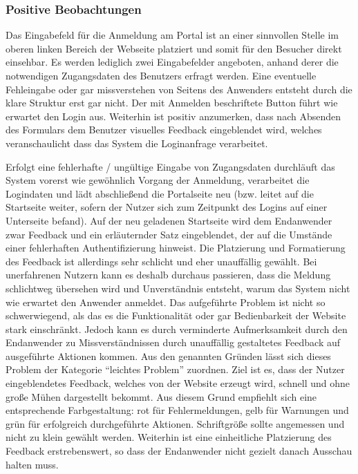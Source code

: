 
\subsubsection*{Positive Beobachtungen}
Das Eingabefeld für die Anmeldung am Portal ist an einer sinnvollen Stelle im oberen linken Bereich der Webseite platziert und somit für den Besucher direkt einsehbar. Es werden lediglich zwei Eingabefelder angeboten, anhand derer die notwendigen Zugangsdaten des Benutzers erfragt werden. Eine eventuelle Fehleingabe oder gar missverstehen von Seitens des Anwenders entsteht durch die klare Struktur erst gar nicht. Der mit Anmelden beschriftete Button führt wie erwartet den Login aus. Weiterhin ist positiv anzumerken, dass nach Absenden des Formulars dem Benutzer visuelles Feedback eingeblendet wird, welches veranschaulicht dass das System die Loginanfrage verarbeitet.

{
	Erfolgt eine fehlerhafte / ungültige Eingabe von Zugangsdaten durchläuft das System vorerst wie gewöhnlich Vorgang der Anmeldung, verarbeitet die Logindaten und lädt abschließend die Portalseite neu (bzw. leitet auf die Startseite weiter, sofern der Nutzer sich zum Zeitpunkt des Logins auf einer Unterseite befand). Auf der neu geladenen Startseite wird dem Endanwender zwar Feedback und ein erläuternder Satz eingeblendet, der auf die Umstände einer fehlerhaften Authentifizierung hinweist. Die Platzierung und Formatierung des Feedback ist allerdings sehr schlicht und eher unauffällig gewählt. Bei unerfahrenen Nutzern kann es deshalb durchaus passieren, dass die Meldung schlichtweg übersehen wird und Unverständnis entsteht, warum das System nicht wie erwartet den Anwender anmeldet.
}
{
	Das aufgeführte Problem ist nicht so schwerwiegend, als das es die Funktionalität oder gar Bedienbarkeit der Website stark einschränkt. Jedoch kann es durch  verminderte Aufmerksamkeit durch den Endanwender zu Missverständnissen durch unauffällig gestaltetes Feedback auf ausgeführte Aktionen kommen. Aus den genannten Gründen lässt sich dieses Problem der Kategorie “leichtes Problem” zuordnen.		
}
{
	Ziel ist es, dass der Nutzer eingeblendetes Feedback, welches von der Website erzeugt wird, schnell und ohne große Mühen dargestellt bekommt. Aus diesem Grund empfiehlt sich eine entsprechende Farbgestaltung: rot für Fehlermeldungen, gelb für Warnungen und grün für erfolgreich durchgeführte Aktionen. Schriftgröße sollte angemessen und nicht zu klein gewählt werden. Weiterhin ist eine einheitliche Platzierung des Feedback erstrebenswert, so dass der Endanwender nicht gezielt danach Ausschau halten muss.
}

